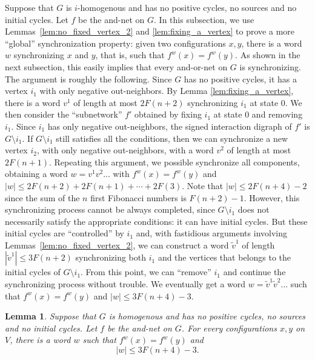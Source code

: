 \documentclass[11pt,letter]{article}
\newtheorem{lemma}{Lemma}
\begin{document}
Suppose that $G$ is $i$-homogenous and has no positive cycles, no sources and no initial cycles. Let $f$ be the and-net on $G$. In this subsection, we use Lemmas~\ref{lem:no_fixed_vertex_2} and \ref{lem:fixing_a_vertex} to prove a more ``global'' synchronization property: given two configurations $x,y$, there is a word $w$ synchronizing $x$ and $y$, that is, such that $f^w(x)=f^w(y)$. As shown in the next subsection, this easily implies that every and-or-net on $G$ is synchronizing. The argument is roughly the following. Since $G$ has no positive cycles, it has a vertex $i_1$ with only negative out-neighbors. By Lemma \ref{lem:fixing_a_vertex}, there is a word $v^1$ of length at most $2F(n+2)$ synchronizing $i_1$ at state $0$. We then consider the ``subnetwork'' $f'$ obtained by fixing $i_1$ at state $0$ and removing $i_1$. Since $i_1$ has only negative out-neighbors, the signed interaction digraph of $f'$ is $G\setminus i_1$. If $G\setminus i_1$ still satisfies all the conditions, then we can synchronize a new vertex $i_2$, with only negative out-neighbors, with a word $v^2$ of length at most $2F(n+1)$. Repeating this argument, we possible synchronize all components, obtaining a word $w=v^1v^2\dots $ with $f^w(x)=f^w(y)$ and $|w|\leq 2F(n+2)+2F(n+1)+\cdots +2F(3)$. Note that $|w|\leq 2F(n+4)-2$ since the sum of the $n$ first Fibonacci numbers is $F(n+2)-1$. However, this synchronizing process cannot be always completed, since $G\setminus i_1$ does not necessarily satisfy the appropriate conditions: it can have initial cycles. But these initial cycles are ``controlled'' by $i_1$ and, with fastidious arguments involving Lemmas~\ref{lem:no_fixed_vertex_2}, we can construct a word $\tilde v^1$ of length $|\tilde v^1|\leq 3F(n+2)$ synchronizing both $i_1$ and the vertices that belongs to the initial cycles of $G\setminus i_1$. From this point, we can ``remove'' $i_1$ and continue the synchronizing process without trouble. We eventually get a word $w=\tilde v^1\tilde v^2\dots$ such that $f^w(x)=f^w(y)$ and $|w|\leq 3F(n+4)-3$. 

\begin{lemma}\label{lem:2-synchronization}
Suppose that $G$ is homogenous and has no positive cycles, no sources and no initial cycles. Let $f$ be the and-net on $G$. For every configurations $x,y$ on $V$, there is a word $w$ such that $f^w(x)=f^w(y)$ and 
\[
|w|\leq 3F(n+4)-3.
\]
\end{lemma}
\end{document}

